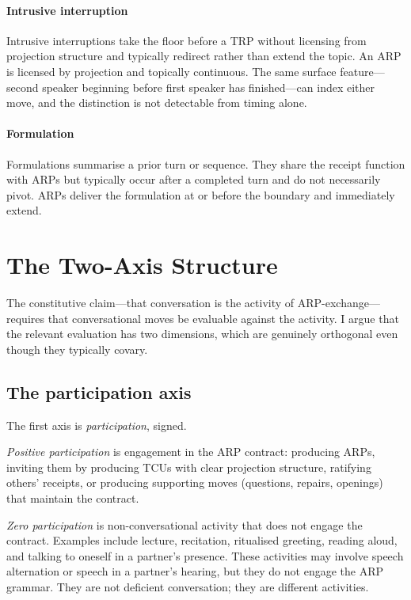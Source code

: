 \paragraph{Intrusive interruption} Intrusive interruptions \citep{WestZimmerman1983} take the floor before a TRP without licensing from projection structure and typically redirect rather than extend the topic. An ARP is licensed by projection and topically continuous. The same surface feature---second speaker beginning before first speaker has finished---can index either move, and the distinction is not detectable from timing alone.

\paragraph{Formulation} Formulations \citep{HeritageWatson1979} summarise a prior turn or sequence. They share the receipt function with ARPs but typically occur after a completed turn and do not necessarily pivot. ARPs deliver the formulation at or before the boundary and immediately extend.

\section{The Two-Axis Structure}\label{sec:plane}

The constitutive claim---that conversation is the activity of ARP-exchange---requires that conversational moves be evaluable against the activity. I argue that the relevant evaluation has two dimensions, which are genuinely orthogonal even though they typically covary.

\subsection{The participation axis}

The first axis is \emph{participation}, signed.

\emph{Positive participation} is engagement in the ARP contract: producing ARPs, inviting them by producing TCUs with clear projection structure, ratifying others' receipts, or producing supporting moves (questions, repairs, openings) that maintain the contract.

\emph{Zero participation} is non-conversational activity that does not engage the contract. Examples include lecture, recitation, ritualised greeting, reading aloud, and talking to oneself in a partner's presence. These activities may involve speech alternation or speech in a partner's hearing, but they do not engage the ARP grammar. They are not deficient conversation; they are different activities.


